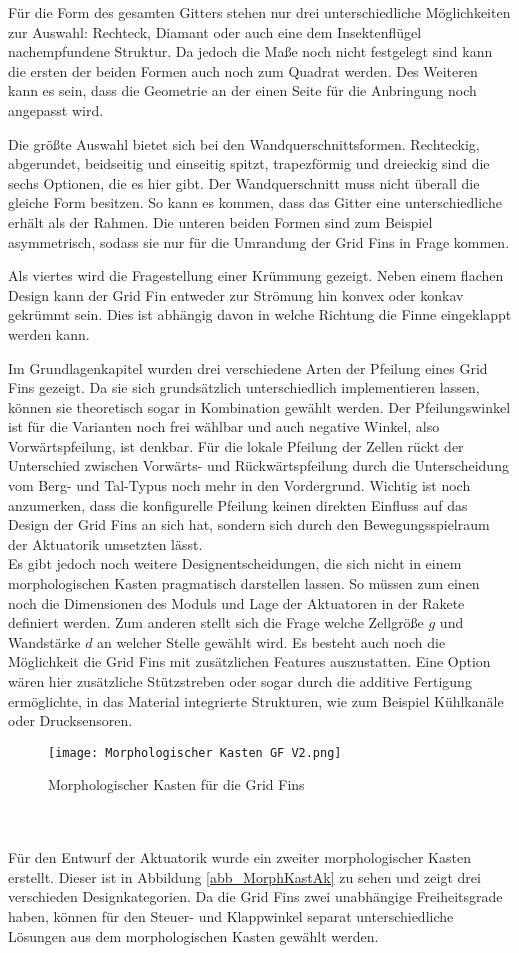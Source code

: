 Für die Form des gesamten Gitters stehen nur drei unterschiedliche Möglichkeiten zur Auswahl: Rechteck, Diamant oder auch eine dem Insektenflügel nachempfundene Struktur. Da jedoch die Maße noch nicht festgelegt sind kann die ersten der beiden Formen auch noch zum Quadrat werden. Des Weiteren kann es sein, dass die Geometrie an der einen Seite für die Anbringung noch angepasst wird.

Die größte Auswahl bietet sich bei den Wandquerschnittsformen. Rechteckig, abgerundet, beidseitig und einseitig spitzt, trapezförmig und dreieckig sind die sechs Optionen, die es hier gibt. Der Wandquerschnitt muss nicht überall die gleiche Form besitzen. So kann es kommen, dass das Gitter eine unterschiedliche erhält als der Rahmen. Die unteren beiden Formen sind zum Beispiel asymmetrisch, sodass sie nur für die Umrandung der Grid Fins in Frage kommen.

Als viertes wird die Fragestellung einer Krümmung gezeigt. Neben einem flachen Design kann der Grid Fin entweder zur Strömung hin konvex oder konkav gekrümmt sein. Dies ist abhängig davon in welche Richtung die Finne eingeklappt werden kann.

Im Grundlagenkapitel wurden drei verschiedene Arten der Pfeilung eines Grid Fins gezeigt. Da sie sich grundsätzlich unterschiedlich implementieren lassen, können sie theoretisch sogar in Kombination gewählt werden. Der Pfeilungswinkel ist für die Varianten noch frei wählbar und auch negative Winkel, also Vorwärtspfeilung, ist denkbar. Für die lokale Pfeilung der Zellen rückt der Unterschied zwischen Vorwärts- und Rückwärtspfeilung durch die Unterscheidung vom Berg- und Tal-Typus noch mehr in den Vordergrund. Wichtig ist noch anzumerken, dass die konfigurelle Pfeilung keinen direkten Einfluss auf das Design der Grid Fins an sich hat, sondern sich durch den Bewegungsspielraum der Aktuatorik umsetzten lässt.\\
Es gibt jedoch noch weitere Designentscheidungen, die sich nicht in einem morphologischen Kasten pragmatisch darstellen lassen. So müssen zum einen noch die Dimensionen des Moduls und Lage der Aktuatoren in der Rakete definiert werden. Zum anderen stellt sich die Frage welche Zellgröße $g$ und Wandstärke $d$ an welcher Stelle gewählt wird. Es besteht auch noch die Möglichkeit die Grid Fins mit zusätzlichen Features auszustatten. Eine Option wären hier zusätzliche Stützstreben oder sogar durch die additive Fertigung ermöglichte, in das Material integrierte Strukturen, wie zum Beispiel Kühlkanäle oder Drucksensoren.
\begin{figure}[h]
	\centering
	\texttt{[image: Morphologischer Kasten GF V2.png]}
	\caption{Morphologischer Kasten für die Grid Fins}
	\label{abb_MorphKastGF}
\end{figure}\\~\\
Für den Entwurf der Aktuatorik wurde ein zweiter morphologischer Kasten erstellt. Dieser ist in Abbildung \ref{abb_MorphKastAk} zu sehen und zeigt drei verschieden Designkategorien. Da die Grid Fins zwei unabhängige Freiheitsgrade haben, können für den Steuer- und Klappwinkel separat unterschiedliche Lösungen aus dem morphologischen Kasten gewählt werden.

